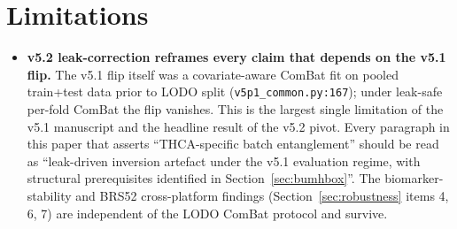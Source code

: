 \documentclass[11pt,a4paper]{article}
\begin{document}
\section{Limitations}
\begin{itemize}
\item \textbf{v5.2 leak-correction reframes every claim that depends on the v5.1 flip.} The v5.1 flip itself was a covariate-aware ComBat fit on pooled train+test data prior to LODO split (\texttt{v5p1\_common.py:167}); under leak-safe per-fold ComBat the flip vanishes. This is the largest single limitation of the v5.1 manuscript and the headline result of the v5.2 pivot. Every paragraph in this paper that asserts ``THCA-specific batch entanglement'' should be read as ``leak-driven inversion artefact under the v5.1 evaluation regime, with structural prerequisites identified in Section~\ref{sec:bumhbox}''. The biomarker-stability and BRS52 cross-platform findings (Section~\ref{sec:robustness} items 4, 6, 7) are independent of the LODO ComBat protocol and survive.


\end{itemize}
\end{document}
